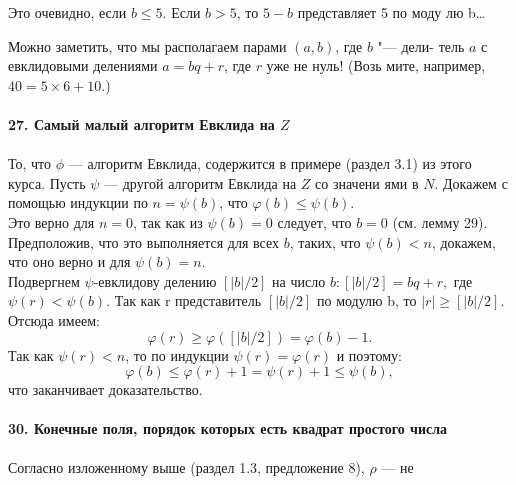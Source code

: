 
Это очевидно, если $b \leq 5$. Если $b > 5$,  то $5 - b$  представляет 5 по моду­\linebreak
лю b\ldots

Можно заметить, что мы располагаем парами $(a,b)$, где $b$ "--- дели-\linebreak
тель $a$  с евклидовыми делениями $a = bq + r$, где $r$ уже не нуль! (Возь­\linebreak
мите, например, $40 = 5 \times 6 + 10$.)\\
\\
\noindent\textbf{27. Самый малый алгоритм Евклида на $Z$}\\
\\
\hspace*{15pt} То, что $\phi$ ---  алгоритм Евклида, содержится в примере (раздел 3.1)\linebreak
из этого курса. Пусть $\psi$ --- другой алгоритм Евклида на $Z$  со значени­\linebreak
ями в $N$. Докажем с помощью индукции по $n =\psi(b)$, что $\varphi(b) \leq \psi(b)$.\\
\hspace*{15pt} Это верно для $n = 0$, так как из $\psi(b) = 0$ следует, что $b = 0$\linebreak
(см. лемму 29). Предположив, что это выполняется для всех $b$, таких,\linebreak
что $\psi(b) < n$,  докажем, что оно верно и для $\psi(b) = n$.\\
\hspace*{15pt} Подвергнем $\psi$-евклидову делению $[|b|/2]$ на число $b:[|b|/2] = bq+r,$\linebreak
где $\psi(r) < \psi(b)$. Так как r  представитель $[|b|/2]$ по модулю  b, то \linebreak
$|r| \geq [|b|/2]$. Отсюда имеем: 
$$\varphi(r) \geq \varphi([|b|/2]) = \varphi(b) - 1.$$
Так как $\psi(r) < n$, то по индукции $\psi(r) = \varphi(r)$ и поэтому:
$$\varphi(b) \leq \varphi(r) + 1 = \psi(r) + 1 \leq \psi(b),$$
что заканчивает доказательство.\\
\\
\noindent\textbf{30. Конечные поля, порядок которых есть квадрат\linebreak
простого числа}\\
\\
\hspace*{0pt} Согласно изложенному выше (раздел 1.3, предложение 8), $\rho$ --- не­\linebreak
